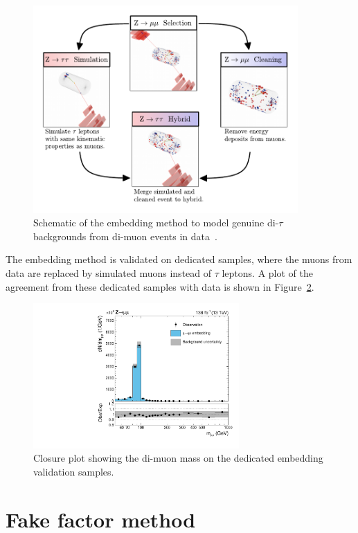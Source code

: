\begin{figure}[!hbtp]
\centering
    \includegraphics[width=0.9\textwidth]{Figures/Embedding_Diagram.pdf}
\caption{Schematic of the embedding method to model genuine di-$\tau$ backgrounds from di-muon events in data~\cite{CMS_embedding}.}
\label{fig:embedding}
\end{figure}

The embedding method is validated on dedicated samples, where the muons from data are replaced by simulated muons instead of $\tau$ leptons.
A plot of the agreement from these dedicated samples with data is shown in Figure~\ref{fig:emb_validation}.

\begin{figure}[!hbtp]
\centering
    \includegraphics[width=0.7\textwidth]{Figures/embedding_validation.pdf}
\caption{Closure plot showing the di-muon mass on the dedicated embedding validation samples.}
\label{fig:emb_validation}
\end{figure}

\section{Fake factor method}
\label{sec:ff}

